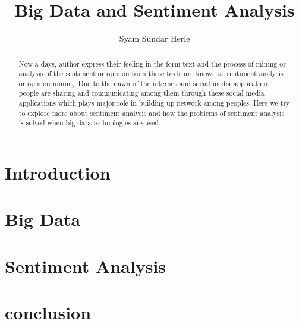 \documentclass[sigconf]{acmart}
\begin{document}
\title{Big Data and Sentiment Analysis}

\author{Syam Sundar Herle}

\begin{abstract}

Now a days, author express their feeling in the form text and the process of mining or analysis of the sentiment or opinion from these texts are known as sentiment analysis or opinion mining. Due to the dawn of the internet and social media application, people are sharing and communicating among them through these social media applications which plays major role in building up network among peoples. Here we try to explore more about sentiment analysis and how the problems of sentiment analysis is solved when big data technologies are used.

\end{abstract}


\maketitle

\section{Introduction}

\section{Big Data}

\section{Sentiment Analysis}

\section{conclusion}
\end{document}
